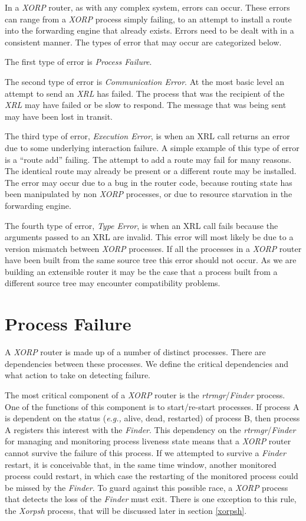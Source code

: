 \documentclass[11pt]{article}
\makeatletter
\newcommand{\eg}{\emph{e.g.,}\xspace}
\newcommand{\xorp} {{\em XORP}\@\xspace}
\newcommand{\finder} {{\em Finder}\@\xspace}
\newcommand{\xorpsh} {{\em Xorpsh}\@\xspace}
\newcommand{\xrl} {{\em XRL}\@\xspace}
\newcommand{\rtrmgr} {{\em rtrmgr}\@\xspace}
\makeatother
\begin{document}
In a \xorp router, as with any complex system, errors can occur. These
errors can range from a \xorp process simply failing, to an attempt to
install a route into the forwarding engine that already exists. Errors
need to be dealt with in a consistent manner. The types
of error that may occur are categorized below.

The first type of error is {\em Process Failure}.

The second type of error is {\em Communication Error}. At the most
basic level an attempt to send an \xrl has failed. The process that
was the recipient of the \xrl may have failed or be slow to respond.
The message that was being sent may have been lost in transit.

The third type of error, {\em Execution Error}, is when an XRL call
returns an error due to some underlying interaction failure. A simple
example of this type of error is a ``route add'' failing. The attempt to
add a route may fail for many reasons. The identical route may already
be present or a different route may be installed. The error may occur
due to a bug in the router code, because routing state has been
manipulated by non \xorp processes, or due to resource starvation in
the forwarding engine.

The fourth type of error, {\em Type Error}, is when an XRL call fails
because the arguments passed to an XRL are invalid. This error will
most likely be due to a version mismatch between \xorp processes. If
all the processes in a \xorp router have been built from the same
source tree this error should not occur. As we are building an
extensible router it may be the case that a process built from a
different source tree may encounter compatibility problems.

\section{\label{pfailure}Process Failure}

A \xorp router is made up of a number of distinct processes. There are
dependencies between these processes. We define the critical
dependencies and what action to take on detecting failure.

The most critical component of a \xorp router is the \rtrmgr/\finder
process. One of the functions of this component is to start/re-start
processes. If process A is dependent on the status (\eg alive, dead,
restarted) of process B, then process A registers this interest with
the \finder. This dependency on the \rtrmgr/\finder for managing and
monitoring process liveness state means that a \xorp router cannot
survive the failure of this process. If we attempted to survive a
\finder restart, it is conceivable that, in the same time window,
another monitored process could restart, in which case the restarting
of the monitored process could be missed by the \finder. To guard
against this possible race, a \xorp process that detects the loss of
the \finder must exit. There is one exception to this rule, the
\xorpsh process, that will be discussed later in section \ref{xorpsh}.
\end{document}
